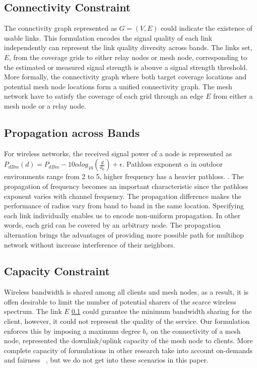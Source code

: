 \subsection{Connectivity Constraint}
\label{subsec:ccconstraint}
The connctivity graph represented as $G=(V,E)$ could indicate the existence of usable links. This formulation encodes the signal quality of each link independently can represent the link quality diversity across bands.
The links set, $E$, from the coverage grids to either relay nodes or mesh node, corresponding to the estimated or measured signal strength is abouve a signal strength threshold. 
More formally, the connectivity graph where both target coverage locations and potential mesh node locations form a unified connectivity graph.
The mesh network have to satisfy the coverage of each grid through an edge $E$ from either a mesh node or a relay node.





\subsection{Propagation across Bands}
 For wireless networks, the received signal power of a node is represented as $P_{dBm}(d)=P_{dBm}-10\alpha log_{10}(\frac{d}{d_0})+\epsilon$. Pathloss exponent $\alpha$ in outdoor environments range from 2 to 5, higher frequency has a heavier pathloss. \cite{camp2006measurement}. 
The propagation of frequency becomes an important characteristic since the pathloss exponent varies with channel frequency. The propagation difference makes the performance of radios vary from band to band in the same location. 
Specifying each link individually enables us to encode non-uniform propagation. In other words, each grid can be covered by an arbitrary node.  
The propagation alternation brings the advantages of providing more possible path for multihop network without increase interference of their neighbors. 


\subsection{Capacity Constraint}
Wireless bandwidth is shared among all clients and mesh nodes, as a result, it is offen desirable to limit the number of potential sharers of the scarce wireless spectrum. 
The link $E$ \ref{subsec:ccconstraint} could gurantee the minimum bandwidth sharing for the client, however, it could not represent the quality of the service. Our formulation enforces this by imposing a maximum degree $b_v$ on the connectivity of a mesh node, represented the downlink/uplink capacity of the mesh node to clients. More complete capacity of formulations in other research take into account on-demands and fairness ~\cite{arkoulis2013optimal}, but we do not get into these scenarios in this paper.


